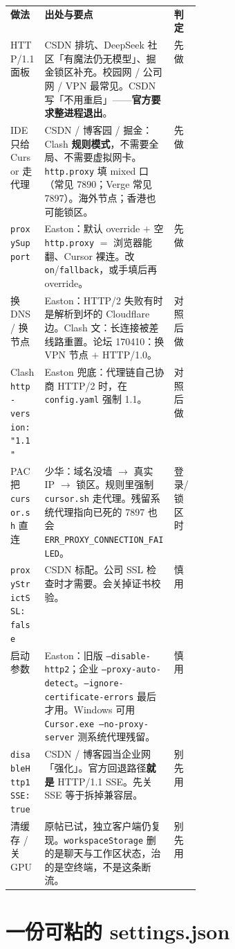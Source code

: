 \documentclass[11pt,a4paper]{ctexart}
\makeatletter
\newcommand{\gradetable}[1]{%
\par
{\footnotesize
\noindent
\begin{tabularx}{\linewidth}{@{}
  >{\raggedright\arraybackslash}p{0.18\linewidth}
  >{\raggedright\arraybackslash}X
  >{\raggedright\arraybackslash}p{0.14\linewidth}@{}}
#1
\end{tabularx}}%
\par
}
\makeatother
\begin{document}
\gradetable{
\rowcolor{yes}
\textbf{做法} & \textbf{出处与要点} & \textbf{判定} \\
\addlinespace[0.12em]
HTTP/1.1 面板 &
CSDN 排坑、DeepSeek 社区「有魔法仍无模型」、掘金锁区补充。校园网 / 公司网 / VPN 最常见。CSDN 写「不用重启」——\textbf{官方要求整进程退出}。 &
先做 \\
\addlinespace[0.08em]
IDE 只给 Cursor 走代理 &
CSDN / 博客园 / 掘金：Clash \textbf{规则模式}，不需要全局、不需要虚拟网卡。\texttt{http.proxy} 填 mixed 口（常见 7890；Verge 常见 7897）。海外节点；香港也可能锁区。 &
先做 \\
\addlinespace[0.08em]
\texttt{proxySupport} &
Easton：默认 override $+$ 空 \texttt{http.proxy} $=$ 浏览器能翻、Cursor 裸连。改 \texttt{on}/\texttt{fallback}，或手填后再 override。 &
先做 \\
\addlinespace[0.08em]
换 DNS / 换节点 &
Easton：HTTP/2 失败有时是解析到坏的 Cloudflare 边。Clash 文：长连接被差线路重置。论坛 170410：换 VPN 节点 $+$ HTTP/1.0。 &
对照后做 \\
\addlinespace[0.08em]
Clash \texttt{http-version: "1.1"} &
Easton 兜底：代理链自己协商 HTTP/2 时，在 \texttt{config.yaml} 强制 1.1。 &
对照后做 \\
\addlinespace[0.08em]
PAC 把 \texttt{cursor.sh} 直连 &
少华：域名没墙 $\rightarrow$ 真实 IP $\rightarrow$ 锁区。规则里强制 \texttt{cursor.sh} 走代理。残留系统代理指向已死的 7897 也会 \texttt{ERR\_PROXY\_CONNECTION\_FAILED}。 &
登录/锁区时 \\
\rowcolor{mid}
\addlinespace[0.08em]
\texttt{proxyStrictSSL: false} &
CSDN 标配。公司 SSL 检查时才需要。会关掉证书校验。 &
慎用 \\
\rowcolor{mid}
\addlinespace[0.08em]
启动参数 &
Easton：旧版 \texttt{--disable-http2}；企业 \texttt{--proxy-auto-detect}。\texttt{--ignore-certificate-errors} 最后才用。Windows 可用 \texttt{Cursor.exe --no-proxy-server} 测系统代理残留。 &
慎用 \\
\rowcolor{no}
\addlinespace[0.08em]
\texttt{disableHttp1SSE: true} &
CSDN / 博客园当企业网「强化」。官方回退路径\textbf{就是} HTTP/1.1 SSE。先关 SSE 等于拆掉兼容层。 &
别先用 \\
\rowcolor{no}
\addlinespace[0.08em]
清缓存 / 关 GPU &
原帖已试，独立客户端仍复现。\texttt{workspaceStorage} 删的是聊天与工作区状态，治的是空终端，不是这条断流。 &
别先用 \\
}

\section{一份可粘的 settings.json}
\end{document}
